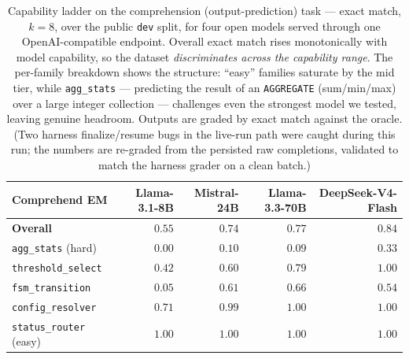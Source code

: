 \begin{table}[t]
\centering
\caption{Capability ladder on the comprehension (output-prediction) task --- exact match,
$k{=}8$, over the public \texttt{dev} split, for four open models served through one
OpenAI-compatible endpoint. Overall exact match rises monotonically with model capability,
so the dataset \emph{discriminates across the capability range}. The per-family breakdown
shows the structure: ``easy'' families saturate by the mid tier, while \texttt{agg\_stats}
--- predicting the result of an \texttt{AGGREGATE} (sum/min/max) over a large integer
collection --- challenges even the strongest model we tested, leaving genuine headroom. Outputs are
graded by exact match against the oracle. (Two harness finalize/resume bugs in the
live-run path were caught during this run; the numbers are re-graded from the persisted
raw completions, validated to match the harness grader on a clean batch.)}
\label{tab:ladder}
\begin{tabular}{@{}lrrrr@{}}
\toprule
Comprehend EM & {\footnotesize Llama-3.1-8B} & {\footnotesize Mistral-24B}
              & {\footnotesize Llama-3.3-70B} & {\footnotesize DeepSeek-V4-Flash} \\
\midrule
\textbf{Overall}              & $0.55$ & $0.74$ & $0.77$ & $0.84$ \\
\midrule
\texttt{agg\_stats} (hard)    & $0.00$ & $0.10$ & $0.09$ & $0.33$ \\
\texttt{threshold\_select}    & $0.42$ & $0.60$ & $0.79$ & $1.00$ \\
\texttt{fsm\_transition}      & $0.05$ & $0.61$ & $0.66$ & $0.54$ \\
\texttt{config\_resolver}     & $0.71$ & $0.99$ & $1.00$ & $1.00$ \\
\texttt{status\_router} (easy)& $1.00$ & $1.00$ & $1.00$ & $1.00$ \\
\bottomrule
\end{tabular}
\end{table}

